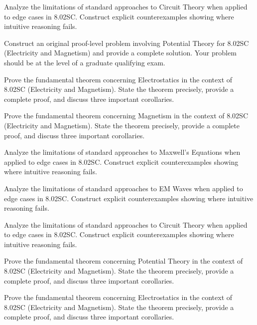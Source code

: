 \documentclass[12pt,a4paper]{exam}
\begin{document}
\begin{questions}
\vspace{0.3cm}

\question[4]
Analyze the limitations of standard approaches to Circuit Theory when applied to edge cases in 8.02SC. Construct explicit counterexamples showing where intuitive reasoning fails.

\vspace{0.3cm}

\question[4]
Construct an original proof-level problem involving Potential Theory for 8.02SC (Electricity and Magnetism) and provide a complete solution. Your problem should be at the level of a graduate qualifying exam.

\vspace{0.3cm}

\question[5]
Prove the fundamental theorem concerning Electrostatics in the context of 8.02SC (Electricity and Magnetism). State the theorem precisely, provide a complete proof, and discuss three important corollaries.

\vspace{0.3cm}

\question[4]
Prove the fundamental theorem concerning Magnetism in the context of 8.02SC (Electricity and Magnetism). State the theorem precisely, provide a complete proof, and discuss three important corollaries.

\vspace{0.3cm}

\question[5]
Analyze the limitations of standard approaches to Maxwell's Equations when applied to edge cases in 8.02SC. Construct explicit counterexamples showing where intuitive reasoning fails.

\vspace{0.3cm}

\question[4]
Analyze the limitations of standard approaches to EM Waves when applied to edge cases in 8.02SC. Construct explicit counterexamples showing where intuitive reasoning fails.

\vspace{0.3cm}

\question[4]
Analyze the limitations of standard approaches to Circuit Theory when applied to edge cases in 8.02SC. Construct explicit counterexamples showing where intuitive reasoning fails.

\vspace{0.3cm}

\question[6]
Prove the fundamental theorem concerning Potential Theory in the context of 8.02SC (Electricity and Magnetism). State the theorem precisely, provide a complete proof, and discuss three important corollaries.

\vspace{0.3cm}

\question[3]
Prove the fundamental theorem concerning Electrostatics in the context of 8.02SC (Electricity and Magnetism). State the theorem precisely, provide a complete proof, and discuss three important corollaries.

\vspace{0.3cm}

\end{questions}
\end{document}
